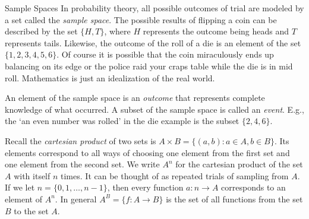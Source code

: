 \begin{section}{Sample Spaces}
In probability theory,
all possible outcomes of trial are modeled by a set called the {\em sample space}.
The possible results of flipping a coin can be described by the set $\{H, T\}$, where $H$ represents
the outcome being heads and $T$ represents tails. Likewise, the outcome of the roll of
a die is an element of the set $\{1,2,3,4,5,6\}$. Of course it is possible that the
coin miraculously ends up balancing on its edge or the police raid your craps table 
while the die is in mid roll. Mathematics is just an idealization of the real world.

An element of the sample space is an {\em outcome} that represents complete knowledge of what occurred.
A subset of the sample space is called an {\em event}. E.g., the `an even number was
rolled' in the die example is the subset $\{2,4,6\}$.

Recall the {\em cartesian product} of two sets is $A\times B = \{(a,b)\colon a\in A, b\in B\}$.
Its elements correspond to all ways of choosing one element from the first set and one
element from the second set.  We write $A^n$ for the cartesian product of the set $A$ with itself $n$ times.
It can be thought of as repeated trials of sampling from $A$. If we let $n = \{0, 1, \dots, n-1\}$,
then every function $a\colon n\to A$ corresponds to an element of $A^n$. In general
$A^B = \{f\colon A\to B\}$ is the set of all functions from the set $B$ to the set $A$.


\end{section}

